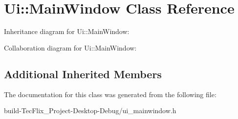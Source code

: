 \hypertarget{classUi_1_1MainWindow}{}\section{Ui\+:\+:Main\+Window Class Reference}
\label{classUi_1_1MainWindow}


Inheritance diagram for Ui\+:\+:Main\+Window\+:


Collaboration diagram for Ui\+:\+:Main\+Window\+:
\subsection*{Additional Inherited Members}


The documentation for this class was generated from the following file\+:\begin{DoxyCompactItemize}
\item 
build-\/\+Tec\+Flix\+\_\+\+Project-\/\+Desktop-\/\+Debug/ui\+\_\+mainwindow.\+h\end{DoxyCompactItemize}
